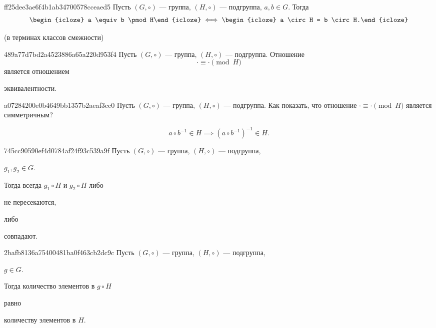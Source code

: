 \begin{note}{ff25dee3ae6f4b1ab34700578cceaed5}
    Пусть \({ (G, \circ) }\) --- группа, \({ (H, \circ) }\) --- подгруппа,\: \({ a, b \in G }\).
    Тогда
    \[
        \begin{icloze}{2}a \equiv b \pmod H\end{icloze} \iff \begin{icloze}{1}a \circ H = b \circ H.\end{icloze}
    \]

    \begin{center}
        \tiny
        (в терминах классов смежности)
    \end{center}
\end{note}

\begin{note}{489a77d7bd2a4523886a65a220d953f4}
    Пусть \({ (G, \circ) }\) --- группа, \({ (H, \circ) }\) --- подгруппа.
    Отношение
    \[
        \cdot \equiv \cdot \pmod{H}
    \]
    является отношением \begin{icloze}{1}эквивалентности.\end{icloze}
\end{note}

\begin{note}{a07284200e0b4649bb1357b2aeaf3cc0}
    Пусть \({ (G, \circ) }\) --- группа, \({ (H, \circ) }\) --- подгруппа.
    Как показать, что отношение \({ \cdot \equiv \cdot \pmod{H} }\) является симметричным?

    \begin{cloze}{1}
        \[
            a \circ b^{-1} \in H \implies (a \circ b^{-1})^{-1} \in H.
        \]
    \end{cloze}
\end{note}

\begin{note}{745cc90590ef4d0784af24f93c539a9f}
    Пусть \({ (G, \circ) }\) --- группа, \({ (H, \circ) }\) --- подгруппа,\: \begin{icloze}{2}\({ g_1, g_2 \in G }\).\end{icloze}
    Тогда всегда \({ g_1 \circ H }\) и \({ g_2 \circ H }\) либо \begin{icloze}{1}не пересекаются,\end{icloze} либо \begin{icloze}{1}совпадают.\end{icloze}
\end{note}

\begin{note}{2bafb8136a75400481ba0f463cb2dc9c}
    Пусть \({ (G, \circ) }\) --- группа, \({ (H, \circ) }\) --- подгруппа,\: \begin{icloze}{3}\({ g \in G }\).\end{icloze}
    \begin{icloze}{2}Тогда количество элементов в \({ g \circ H }\)\end{icloze} равно \begin{icloze}{1}количеству элементов в \({ H }\).\end{icloze}
\end{note}

